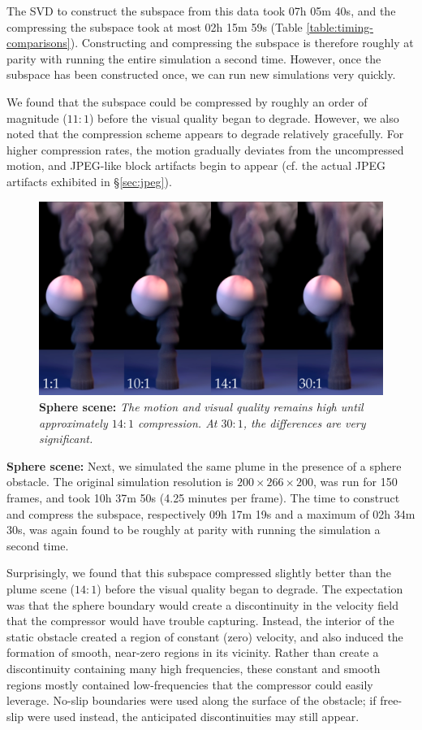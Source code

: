 The SVD to construct the subspace from this data took 07h 05m 40s, and the compressing the subspace took at most 02h 15m 59s (Table \ref{table:timing-comparisons}). Constructing and compressing the subspace is therefore roughly at parity with running the entire simulation a second time. However, once the subspace has been constructed once, we can run new simulations very quickly.

We found that the subspace could be compressed by roughly an order of magnitude ($11:1$) before the visual quality began to degrade. However, we also noted that the compression scheme appears to degrade relatively gracefully. For higher compression rates, the motion gradually deviates from the uncompressed motion, and JPEG-like block artifacts begin to appear (cf. the actual JPEG artifacts exhibited in \S\ref{sec:jpeg}).

\begin{figure}[t]
\includegraphics[width=\columnwidth]{chap4/figures/spheres_sidebyside_14.png}
\caption{\textbf{Sphere scene:} {\em The motion and visual quality remains high until approximately $14:1$ compression. At $30:1$, the differences are very significant.}}
\label{fig:sphereComparison}
\end{figure}

\noindent \textbf{Sphere scene:} Next, we simulated the same plume in the presence of a sphere obstacle. The original simulation resolution is $200 \times 266 \times 200$, was run for 150 frames, and took 10h 37m 50s (4.25 minutes per frame). The time to construct and compress the subspace, respectively 09h 17m 19s and a maximum of 02h 34m 30s, was again found to be roughly at parity with running the simulation a second time. 

Surprisingly, we found that this subspace compressed slightly better than the plume scene ($14:1$) before the visual quality began to degrade. The expectation was that the sphere boundary would create a discontinuity in the velocity field that the compressor would have trouble capturing. Instead, the interior of the static obstacle created a region of constant (zero) velocity, and also induced the formation of smooth, near-zero regions in its vicinity. Rather than create a discontinuity containing many high frequencies, these constant and smooth regions mostly contained low-frequencies that the compressor could easily leverage. No-slip boundaries were used along the surface of the obstacle; if free-slip were used instead, the anticipated discontinuities may still appear.

